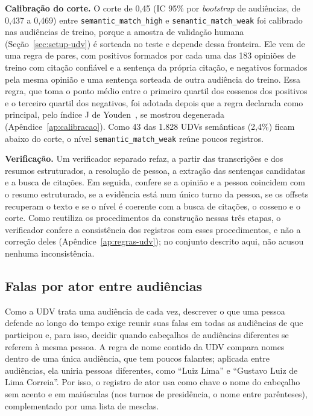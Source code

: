 \textbf{Calibração do corte.} O corte de 0,45 (IC 95\% por \textit{bootstrap} de audiências, de 0,437
a 0,469) entre \texttt{semantic\_match\_high} e \texttt{semantic\_match\_weak} foi calibrado nas
audiências de treino, porque a amostra de validação humana (Seção~\ref{sec:setup-udv}) é sorteada
no teste e depende dessa fronteira. Ele vem de uma regra de pares, com positivos formados por cada
uma das 183 opiniões de treino com citação confiável e a sentença da própria citação, e negativos
formados pela mesma opinião e uma sentença sorteada de outra audiência do treino. Essa regra, que toma
o ponto médio entre o primeiro quartil dos cossenos dos positivos e o terceiro quartil dos negativos,
foi adotada depois que a regra declarada como principal, pelo índice J de
Youden~\citep{youden1950index}, se mostrou degenerada (Apêndice~\ref{ap:calibracao}). Como 43 das
1.828 UDVs semânticas (2,4\%) ficam abaixo do corte, o nível \texttt{semantic\_match\_weak} reúne
poucos registros.

\textbf{Verificação.} Um verificador separado refaz, a partir das transcrições e dos resumos
estruturados, a resolução de pessoa, a extração das sentenças candidatas e a busca de citações.
Em seguida, confere se a opinião e a pessoa coincidem com o resumo estruturado, se a evidência está
num único turno da pessoa, se os offsets recuperam o texto e se o nível é coerente com a busca de
citações, o cosseno e o corte. Como reutiliza os procedimentos da construção nessas três etapas, o
verificador confere a consistência dos registros com esses procedimentos, e não a correção deles
(Apêndice~\ref{ap:regras-udv}); no conjunto descrito aqui, não acusou nenhuma inconsistência.

\subsection{Falas por ator entre audiências}
\label{sec:metodo-atores}

Como a UDV trata uma audiência de cada vez, descrever o que uma pessoa defende ao longo do tempo
exige reunir suas falas em todas as audiências de que participou e, para isso, decidir quando
cabeçalhos de audiências diferentes se referem à mesma pessoa. A regra de nome contido da UDV compara
nomes dentro de uma única audiência, que tem poucos falantes; aplicada entre audiências, ela uniria
pessoas diferentes, como ``Luiz Lima'' e ``Gustavo Luiz de Lima Correia''. Por isso, o registro de
ator usa como chave o nome do cabeçalho sem acento e em maiúsculas (nos turnos de presidência, o nome
entre parênteses), complementado por uma lista de mesclas.

